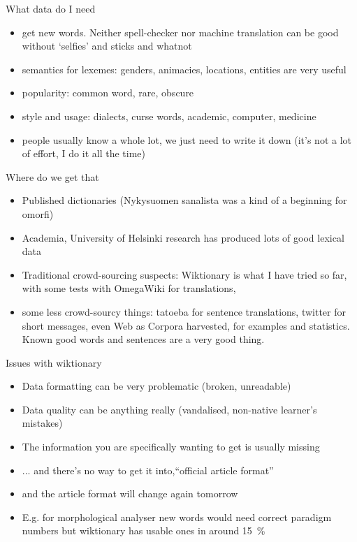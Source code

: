 \documentclass{beamer}
\begin{document}
\begin{frame}{What data do I need}
    \begin{itemize}
        \item get new words. Neither spell-checker nor machine
            translation can be good without `selfies' and sticks and whatnot
        \item semantics for lexemes: genders, animacies,
            locations, entities are very useful
        \item popularity: common word, rare, obscure
        \item style and usage: dialects, curse words, academic, computer,
            medicine
        \item people usually know a whole lot, we just need to write it down
            (it's not a lot of effort, I do it all the time)
    \end{itemize}
\end{frame}


\begin{frame}{Where do we get that}
    \begin{itemize}
        \item Published dictionaries (Nykysuomen sanalista was a kind of a beginning for omorfi)
        \item Academia, University of Helsinki research has produced lots of good lexical data
        \item Traditional crowd-sourcing suspects: Wiktionary is what I have
            tried so far, with some tests with OmegaWiki for translations,
        \item some less crowd-sourcy things: tatoeba for sentence translations,
            twitter for short messages, even Web as Corpora harvested,
            for examples and statistics. Known good words and sentences are
            a very good thing.
    \end{itemize}
\end{frame}

\begin{frame}{Issues with wiktionary}
    \begin{itemize}
        \item Data formatting can be very problematic (broken, unreadable)
        \item Data quality can be anything really (vandalised, non-native learner's mistakes)
        \item The information you are specifically wanting to get is usually missing
        \item ... and there's no way to get it into,``official article
            format''
        \item and the article format will change again tomorrow
        \item E.g. for morphological analyser new words would need correct
            paradigm numbers but wiktionary has usable ones in around 15~\%
    \end{itemize}
\end{frame}
\end{document}
